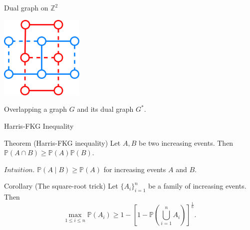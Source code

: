 \documentclass{beamer}
\begin{document}
%    

\begin{frame}{Dual graph on $\mathbb{Z}^{2}$}
    \begin{center}
    \includegraphics[width=4cm]{./dool3.png}
    
     Overlapping a graph $G$ and its dual graph $G^{*}$.
    \end{center}
\end{frame}


\begin{frame}{Harris-FKG Inequality}
\begin{block}{Theorem (Harris-FKG inequality)}
Let $A,B$ be two increasing events. Then $\mathbb{P}(A\cap B)\geq\mathbb{P}(A)\mathbb{P}(B)$.
\end{block}
$Intuition.$ $\mathbb{P}(A \mid B)\geq\mathbb{P}(A)$ for increasing events $A$ and $B$.
\begin{block}{Corollary (The square-root trick)}
Let $\{A_i\}_{i=1}^n$ be a family of increasing events. Then 
\[\max_{1 \leq i \leq
 n} \mathbb{P}(A_i) \geq 1 - \left[1 - \mathbb{P}\left(\bigcup_{i = 1}^n A_i\right)\right]^{\frac{1}{n}}.\]
\end{block}
\end{frame}
\end{document}
